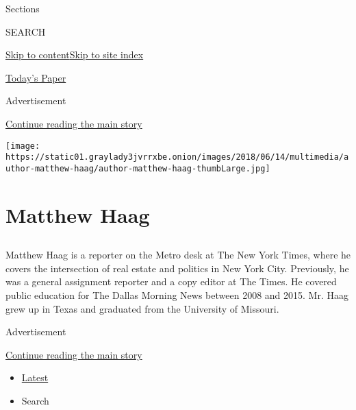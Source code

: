 Sections

SEARCH

\protect\hyperlink{site-content}{Skip to
content}\protect\hyperlink{site-index}{Skip to site index}

\href{https://myaccount.nytimes3xbfgragh.onion/auth/login?response_type=cookie\&client_id=vi}{}

\href{https://www.nytimes3xbfgragh.onion/section/todayspaper}{Today's
Paper}

Advertisement

\protect\hyperlink{after-top}{Continue reading the main story}

\texttt{[image: https://static01.graylady3jvrrxbe.onion/images/2018/06/14/multimedia/author-matthew-haag/author-matthew-haag-thumbLarge.jpg]}

\hypertarget{matthew-haag}{%
\section{Matthew Haag}\label{matthew-haag}}

\hypertarget{section}{%
\subsection{}\label{section}}

Matthew Haag is a reporter on the Metro desk at The New York Times,
where he covers the intersection of real estate and politics in New York
City. Previously, he was a general assignment reporter and a copy editor
at The Times. He covered public education for The Dallas Morning News
between 2008 and 2015. Mr. Haag grew up in Texas and graduated from the
University of Missouri.

Advertisement

\protect\hyperlink{after-mid1}{Continue reading the main story}

\begin{itemize}
\tightlist
\item
  \protect\hyperlink{stream-panel}{Latest}
\item
  Search
\end{itemize}

